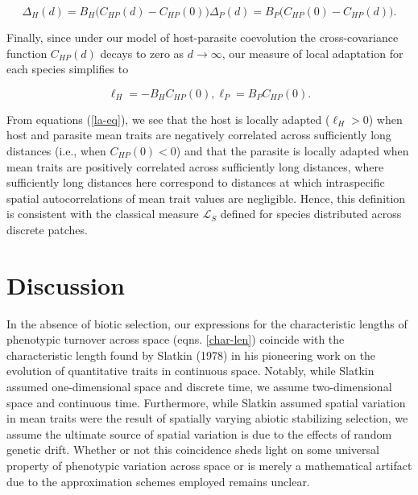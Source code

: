 \documentclass{article}
\begin{document}
\begin{subequations}
  \begin{equation}
    \Delta_H(d)=B_H\big(C_{HP}(d)-C_{HP}(0)\big)
  \end{equation}
  \begin{equation}
    \Delta_P(d)=B_P\big(C_{HP}(0)-C_{HP}(d)\big).
  \end{equation}
\end{subequations}

Finally, since under our model of host-parasite coevolution the
cross-covariance function \(C_{HP}(d)\) decays to zero as
\(d\to\infty\), our measure of local adaptation for each species
simplifies to

\begin{subequations}\label{la-eq}
  \begin{equation}
    \ell_H = -B_HC_{HP}(0),
  \end{equation}
  \begin{equation}
    \ell_P = B_PC_{HP}(0).
  \end{equation}
\end{subequations}

From equations (\ref{la-eq}), we see that the host is locally adapted
(\(\ell_H>0\)) when host and parasite mean traits are negatively
correlated across sufficiently long distances (i.e., when
\(C_{HP}(0)<0\)) and that the parasite is locally adapted when mean
traits are positively correlated across sufficiently long distances,
where sufficiently long distances here correspond to distances at which
intraspecific spatial autocorrelations of mean trait values are
negligible. Hence, this definition is consistent with the classical
measure \(\mathcal L_S\) defined for species distributed across discrete
patches.

\hypertarget{discussion}{%
\section{Discussion}\label{discussion}}

In the absence of biotic selection, our expressions for the
characteristic lengths of phenotypic turnover across space (eqns.
\ref{char-len}) coincide with the characteristic length found by Slatkin
(1978) in his pioneering work on the evolution of quantitative traits in
continuous space. Notably, while Slatkin assumed one-dimensional space
and discrete time, we assume two-dimensional space and continuous time.
Furthermore, while Slatkin assumed spatial variation in mean traits were
the result of spatially varying abiotic stabilizing selection, we assume
the ultimate source of spatial variation is due to the effects of random
genetic drift. Whether or not this coincidence sheds light on some
universal property of phenotypic variation across space or is merely a
mathematical artifact due to the approximation schemes employed remains
unclear.
\end{document}
